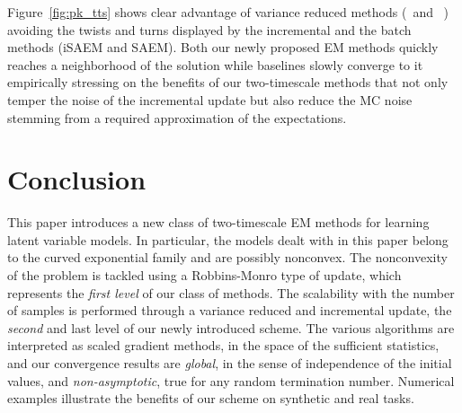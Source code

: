 \documentclass[journal, 11pt]{IEEEtran}
\begin{document}
        

Figure~\ref{fig:pk_tts} shows clear advantage of variance reduced methods (\SAEMVR\ and \FISAEM\ ) avoiding the twists and turns displayed by the incremental and the batch methods (iSAEM and SAEM).
Both our newly proposed EM methods quickly reaches a neighborhood of the solution while baselines slowly converge to it empirically stressing on the benefits of our two-timescale methods that not only temper the noise of the incremental update but also reduce the MC noise stemming from a required approximation of the expectations.




\section{Conclusion}


This paper introduces a new class of two-timescale EM methods for learning latent variable models.
In particular, the models dealt with in this paper belong to the curved exponential family and are possibly nonconvex.
The nonconvexity of the problem is tackled using a Robbins-Monro type of update, which represents the \textit{first level} of our class of methods.
The scalability with the number of samples is performed through a variance reduced and incremental update, the \textit{second} and last level of our newly introduced scheme.
The various algorithms are interpreted as scaled gradient methods, in the space of the sufficient statistics, and our convergence results are \emph{global}, in the sense of independence of the initial values, and \emph{non-asymptotic}, \ie true for any random termination number.
Numerical examples illustrate the benefits of our scheme on synthetic and real tasks.
\end{document}
